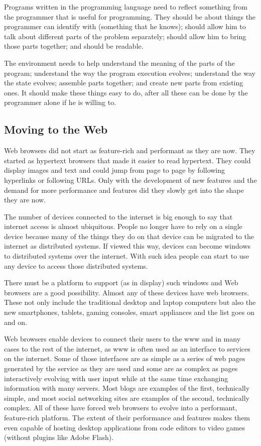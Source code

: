 \documentclass{./llncs2e/llncs}
\begin{document}
	Programs written in the programming language need to reflect something from the programmer that is useful for programming.
	They should be about things the programmer can identify with (something that he knows); should allow him to talk about different parts of the problem separately; should allow him to bring those parts together; and should be readable.
	
	The environment needs to help understand the meaning of the parts of the program; understand the way the program execution evolves; understand the way the state evolves; assemble parts together; and create new parts from existing ones.
	It should make these things easy to do, after all these can be done by the programmer alone if he is willing to.

\subsection{Moving to the Web}
	Web browsers did not start as feature-rich and performant as they are now.
	They started as hypertext browsers that made it easier to read hypertext.
	They could display images and text and could jump from page to page by following hyperlinks or following URLs.
	Only with the development of new features and the demand for more performance and features did they slowly get into the shape they are now.

	The number of devices connected to the internet is big enough to say that internet access is almost ubiquitous.
	People no longer have to rely on a single device because many of the things they do on that device can be migrated to the internet as distributed systems.
	If viewed this way, devices can become windows to distributed systems over the internet.
	With such idea people can start to use any device to access those distributed systems.

	There must be a platform to support (as in display) such windows and Web browsers are a good possibility.
	Almost any of these devices have web browsers.
	These not only include the traditional desktop and laptop computers but also the new smartphones, tablets, gaming consoles, smart appliances and the list goes on and on.

	Web browsers enable devices to connect their users to the \ac{www} and in many cases to the rest of the internet, as \ac{www} is often used as an interface to services on the internet.
	Some of those interfaces are as simple as a series of web pages generated by the service as they are used and some are as complex as pages interactively evolving with user input while at the same time exchanging information with many servers.
	Most blogs are examples of the first, technically simple, and most social networking sites are examples of the second, technically complex.
	All of these have forced web browsers to evolve into a performant, feature-rich platform.
	The extent of their performance and features makes them even capable of hosting desktop applications from code editors to video games (without plugins like Adobe Flash).
\end{document}
